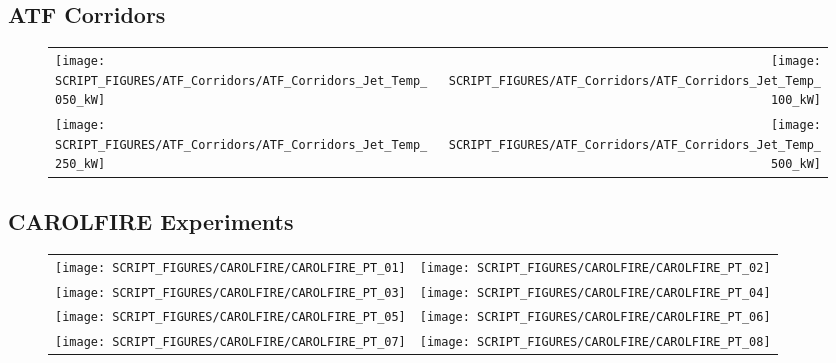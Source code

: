 

\subsection{ATF Corridors}

\begin{figure}[p]
\begin{tabular*}{\textwidth}{l@{\extracolsep{\fill}}r}
\texttt{[image: SCRIPT\_FIGURES/ATF\_Corridors/ATF\_Corridors\_Jet\_Temp\_050\_kW]} &
\texttt{[image: SCRIPT\_FIGURES/ATF\_Corridors/ATF\_Corridors\_Jet\_Temp\_100\_kW]} \\
\texttt{[image: SCRIPT\_FIGURES/ATF\_Corridors/ATF\_Corridors\_Jet\_Temp\_250\_kW]} &
\texttt{[image: SCRIPT\_FIGURES/ATF\_Corridors/ATF\_Corridors\_Jet\_Temp\_500\_kW]}
\end{tabular*}
\end{figure}

\clearpage

\subsection{CAROLFIRE Experiments}

\begin{figure}[p]
\begin{tabular*}{\textwidth}{l@{\extracolsep{\fill}}r}
\texttt{[image: SCRIPT\_FIGURES/CAROLFIRE/CAROLFIRE\_PT\_01]} &
\texttt{[image: SCRIPT\_FIGURES/CAROLFIRE/CAROLFIRE\_PT\_02]} \\
\texttt{[image: SCRIPT\_FIGURES/CAROLFIRE/CAROLFIRE\_PT\_03]} &
\texttt{[image: SCRIPT\_FIGURES/CAROLFIRE/CAROLFIRE\_PT\_04]} \\
\texttt{[image: SCRIPT\_FIGURES/CAROLFIRE/CAROLFIRE\_PT\_05]} &
\texttt{[image: SCRIPT\_FIGURES/CAROLFIRE/CAROLFIRE\_PT\_06]} \\
\texttt{[image: SCRIPT\_FIGURES/CAROLFIRE/CAROLFIRE\_PT\_07]} &
\texttt{[image: SCRIPT\_FIGURES/CAROLFIRE/CAROLFIRE\_PT\_08]}
\end{tabular*}
\end{figure}

